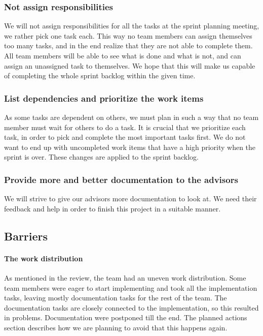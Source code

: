 \subsubsection{Not assign responsibilities}
We will not assign responsibilities for all the tasks at the sprint planning meeting, we rather pick one task each. This way no team members can assign themselves too many tasks, and in the end realize that they are not able to complete them. All team members will be able to see what is done and what is not, and can assign an unassigned task to themselves. We hope that this will make us capable of completing the whole sprint backlog within the given time.

\subsubsection{List dependencies and prioritize the work items}
As some tasks are dependent on others, we must plan in such a way that no team member must wait for others to do a task. It is crucial that we prioritize each task, in order to pick and complete the most important tasks first. We do not want to end up with uncompleted work items that have a high priority when the sprint is over. These changes are applied to the sprint backlog.

\subsubsection{Provide more and better documentation to the advisors}
We will strive to give our advisors more documentation to look at. We need their feedback and help in order to finish this project in a suitable manner. 

\subsection{Barriers}
\paragraph{The work distribution} 
As mentioned in the review, the team had an uneven work distribution. Some team members were eager to start implementing and took all the implementation tasks, leaving mostly documentation tasks for the rest of the team. The documentation tasks are closely connected to the implementation, so this resulted in problems. Documentation were postponed till the end. The planned actions section describes how we are planning to avoid that this happens again. 


